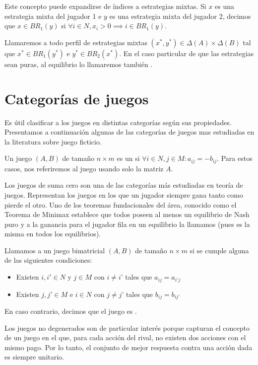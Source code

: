 Este concepto puede expandirse de índices a estrategias mixtas. Si $x$ es una estrategia mixta del jugador 1 e $y$ es una estrategia mixta del jugador 2, decimos que $x \in BR_1(y)$ si $\forall i \in N, x_i > 0 \implies i \in BR_1(y)$.

Llamaremos  a todo perfil de estrategias mixtas $(x^*, y^*) \in \Delta(A) \times \Delta(B)$ tal que $x^* \in BR_1(y^*)$ e $y^* \in BR_2(x^*)$. En el caso particular de que las estrategias sean puras, al equilibrio lo llamaremos también .

\section{Categorías de juegos}

Es útil clasificar a los juegos en distintas categorías según sus propiedades. Presentamos a continuación algunas de las categorías de juegos mas estudiadas en la literatura sobre juego ficticio.

\begin{definition}
    Un juego $(A, B)$ de tamaño $n \times m$ es un  si $\forall i \in N, j \in M : a_{ij} = -b_{ij}$. Para estos casos, nos referiremos al juego usando solo la matriz $A$.
\end{definition}

Los juegos de suma cero son una de las categorías más estudiadas en teoría de juegos. Representan los juegos en los que un jugador siempre gana tanto como pierde el otro. Uno de los teoremas fundacionales del área, conocido como el Teorema de Minimax \cite{nash:minimax} establece que todos poseen al menos un equilibrio de Nash puro y a la ganancia para el jugador fila en un equilibrio la llamamos  (pues es la misma en todos los equilibrios).

\begin{definition}
    Llamamos  a un juego bimatricial $(A, B)$ de tamaño $n \times m$ si se cumple alguna de las siguientes condiciones:
    \begin{itemize}
        \item Existen $i, i' \in N$ y $j \in M$ con $i \neq i$' tales que $a_{ij} = a_{i'j}$
        \item Existen $j, j' \in M$ e $i \in N$ con $j \neq j$' tales que $b_{ij} = b_{ij'}$
    \end{itemize}
    En caso contrario, decimos que el juego es .
\end{definition}
Los juegos no degenerados son de particular interés porque capturan el concepto de un juego en el que, para cada acción del rival, no existen dos acciones con el mismo pago. Por lo tanto, el conjunto de mejor respuesta contra una acción dada es siempre unitario.

